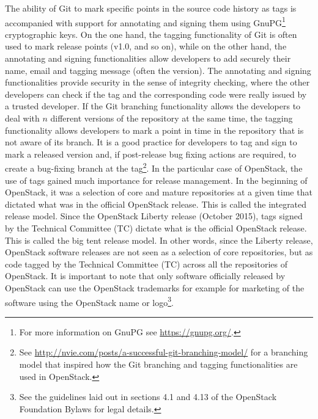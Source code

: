 \documentclass[dvipsnames]{bmcart}
\theoremstyle{definition}
\begin{document}
 
The ability of Git to mark specific points in the source code history as tags is accompanied with support for annotating and signing them using GnuPG\footnote{For more information on GnuPG see \url{https://gnupg.org/}.} cryptographic keys.  On the one hand, the tagging functionality of Git is often used to mark release points (v1.0, and so on), while on the other hand, the annotating and signing functionalities allow developers to add securely their name, email and tagging message (often the version). The annotating and signing functionalities provide security in the sense of integrity checking, where the other developers can check if the tag and the corresponding code were really issued by a trusted developer. 
If the Git branching functionality allows the developers to deal with $n$ different versions of the repository at the same time, the tagging functionality allows developers to mark a point in time in the repository that is not aware of its branch. It is a good practice for developers to tag and sign to mark a released version and, if post-release bug fixing actions are required, to create a bug-fixing branch at the tag\footnote{See \url{http://nvie.com/posts/a-successful-git-branching-model/} for a branching model that inspired how the Git branching and tagging functionalities are used in OpenStack.}.  In the particular case of OpenStack,  the use of tags gained much importance for release management.  In the beginning of OpenStack, it was a selection of core and mature repositories at a given time that dictated what was in the official OpenStack release. This is called the integrated release model. Since the OpenStack Liberty release (October 2015), tags signed by the  Technical Committee (TC)  dictate what is the official OpenStack release. This is called the big tent release model. In other words, since the Liberty release, OpenStack software releases are not seen as a selection of core repositories, but as code tagged by the Technical Committee (TC) across all the repositories of OpenStack. It is important to note that only software officially released by OpenStack can use the OpenStack trademarks for example for marketing of the software using the OpenStack name or logo\footnote{See the guidelines laid out in sections 4.1 and 4.13 of the OpenStack Foundation Bylaws for legal details.}.  
 
 
 
 
\end{document}
